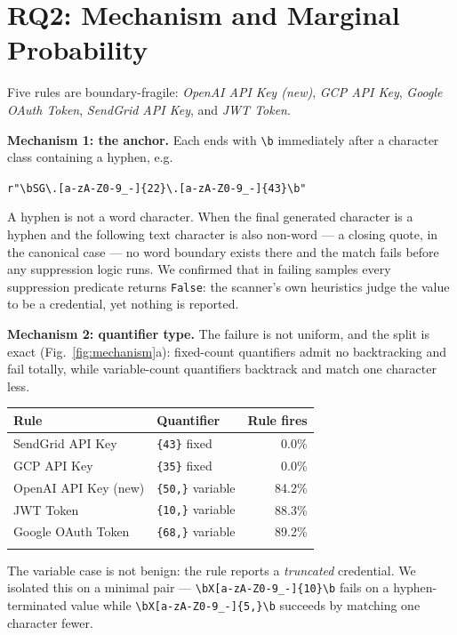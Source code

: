 \documentclass[pdflatex,sn-basic]{sn-jnl}
\begin{document}
\section{RQ2: Mechanism and Marginal Probability}
\label{sec:rq2}

Five rules are boundary-fragile: \emph{OpenAI API Key (new)}, \emph{GCP API Key}, \emph{Google OAuth Token}, \emph{SendGrid API Key}, and \emph{JWT Token}.

\textbf{Mechanism 1: the anchor.} Each ends with \verb|\b| immediately after a character class containing a hyphen, e.g.
\begin{center}
\lstinline!r"\bSG\.[a-zA-Z0-9_-]{22}\.[a-zA-Z0-9_-]{43}\b"!
\end{center}
A hyphen is not a word character. When the final generated character is a hyphen and the following text character is also non-word --- a closing quote, in the canonical case --- no word boundary exists there and the match fails before any suppression logic runs. We confirmed that in failing samples every suppression predicate returns \texttt{False}: the scanner's own heuristics judge the value to be a credential, yet nothing is reported.

\textbf{Mechanism 2: quantifier type.} The failure is not uniform, and the split is exact (Fig.~\ref{fig:mechanism}a): fixed-count quantifiers admit no backtracking and fail totally, while variable-count quantifiers backtrack and match one character less.

\begin{center}\small
\begin{tabular}{@{}llr@{}}
\toprule
Rule & Quantifier & Rule fires \\
\midrule
SendGrid API Key & \texttt{\{43\}} fixed & 0.0\% \\
GCP API Key & \texttt{\{35\}} fixed & 0.0\% \\
OpenAI API Key (new) & \texttt{\{50,\}} variable & 84.2\% \\
JWT Token & \texttt{\{10,\}} variable & 88.3\% \\
Google OAuth Token & \texttt{\{68,\}} variable & 89.2\% \\
\botrule
\end{tabular}
\end{center}

The variable case is not benign: the rule reports a \emph{truncated} credential. We isolated this on a minimal pair --- \verb|\bX[a-zA-Z0-9_-]{10}\b| fails on a hyphen-terminated value while \verb|\bX[a-zA-Z0-9_-]{5,}\b| succeeds by matching one character fewer.
\end{document}
